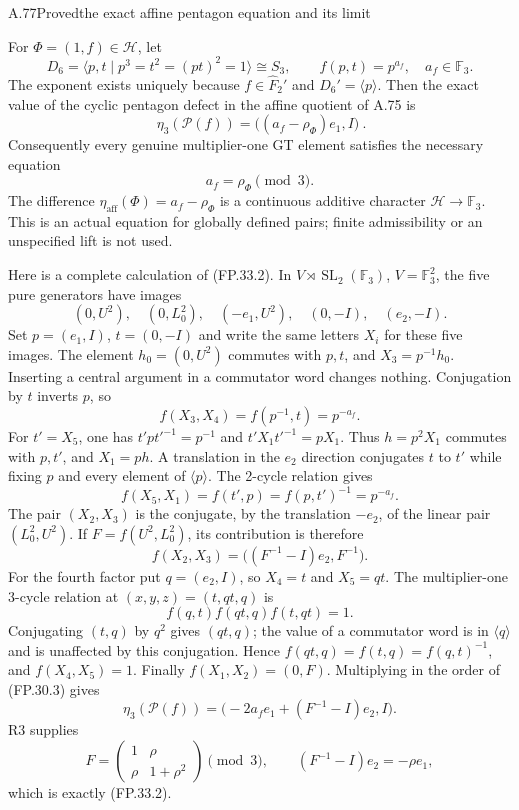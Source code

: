 \begin{statement}{A.77}{Proved}{the exact affine pentagon equation and its limit}
\end{statement}
For $\Phi=(1,f)\in\mathcal H$, let
\[
 D_6=\langle p,t\mid p^3=t^2=(pt)^2=1\rangle\cong S_3,
 \qquad f(p,t)=p^{a_f},\quad a_f\in\mathbb F_3.
 \tag{FP.33.1}
\]
The exponent exists uniquely because $f\in\widehat F_2'$ and
$D_6'=\langle p\rangle$. Then the exact value of the cyclic
pentagon defect in the affine quotient of A.75 is
\[
 \boxed{\ \eta_3(\mathcal P(f))
             =\bigl((a_f-\rho_\Phi)e_1,I\bigr)\ }.
 \tag{FP.33.2}
\]
Consequently every genuine multiplier-one GT element satisfies the
necessary equation
\[
 a_f=\rho_\Phi\pmod3.
 \tag{FP.33.3}
\]
The difference $\eta_{\mathrm{aff}}(\Phi)=a_f-\rho_\Phi$ is a
continuous additive character $\mathcal H\to\mathbb F_3$.
This is an actual equation for globally defined pairs; finite
admissibility or an unspecified lift is not used.

Here is a complete calculation of (FP.33.2).
In $V\rtimes\operatorname{SL}_2(\mathbb F_3)$, $V=\mathbb F_3^2$,
the five pure generators have images
\[
 (0,U^2),\quad(0,L_0^2),\quad(-e_1,U^2),\quad
 (0,-I),\quad(e_2,-I).
 \tag{FP.33.4}
\]
Set $p=(e_1,I)$, $t=(0,-I)$ and write the same letters $X_i$
for these five images. The element $h_0=(0,U^2)$ commutes with
$p,t$, and $X_3=p^{-1}h_0$. Inserting a central argument in a
commutator word changes nothing. Conjugation by $t$ inverts $p$,
so
\[
 f(X_3,X_4)=f(p^{-1},t)=p^{-a_f}.
\]
For $t'=X_5$, one has $t'pt'^{-1}=p^{-1}$ and
$t'X_1t'^{-1}=pX_1$. Thus $h=p^2X_1$ commutes with $p,t'$,
and $X_1=ph$. A translation in the $e_2$ direction conjugates
$t$ to $t'$ while fixing $p$ and every element of $\langle p\rangle$.
The 2-cycle relation gives
\[
 f(X_5,X_1)=f(t',p)=f(p,t')^{-1}=p^{-a_f}.
\]
The pair $(X_2,X_3)$ is the conjugate, by the translation $-e_2$,
of the linear pair $(L_0^2,U^2)$. If
$F=f(U^2,L_0^2)$, its contribution is therefore
\[
 f(X_2,X_3)=\bigl((F^{-1}-I)e_2,F^{-1}\bigr).
\]
For the fourth factor put $q=(e_2,I)$, so $X_4=t$ and $X_5=qt$.
The multiplier-one 3-cycle relation at $(x,y,z)=(t,qt,q)$ is
\[
 f(q,t)f(qt,q)f(t,qt)=1.
\]
Conjugating $(t,q)$ by $q^2$ gives $(qt,q)$; the value of a
commutator word is in $\langle q\rangle$ and is unaffected by this
conjugation. Hence $f(qt,q)=f(t,q)=f(q,t)^{-1}$, and
$f(X_4,X_5)=1$. Finally $f(X_1,X_2)=(0,F)$.
Multiplying in the order of (FP.30.3) gives
\[
 \eta_3(\mathcal P(f))
       =\bigl(-2a_f e_1+(F^{-1}-I)e_2,I\bigr).
\]
R3 supplies
\[
 F=\begin{pmatrix}1&\rho\\\rho&1+\rho^2\end{pmatrix}\pmod3,
 \qquad (F^{-1}-I)e_2=-\rho e_1,
\]
which is exactly (FP.33.2).

